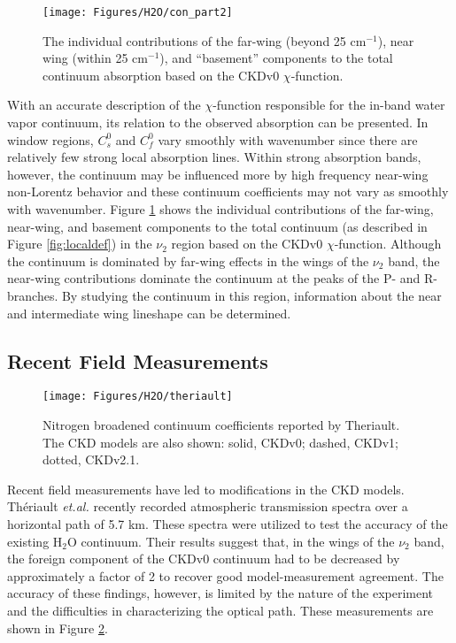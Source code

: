 \documentclass[11pt]{article}
\begin{document}
\begin{figure}
\begin{center}
  \texttt{[image: Figures/H2O/con\_part2]}\end{center}
  \caption[Far-wing, near-wing, and basement contributions to the total continuum.]
	{The individual contributions of the far-wing 
    (beyond 25 cm$^{-1}$), near wing (within 25 cm$^{-1}$), and 
    ``basement'' components to the total continuum
    absorption based on the CKDv0 $\chi$-function.}
  \label{fig:parts}
\end{figure}

With an accurate description of the $\chi$-function responsible for the
in-band water vapor continuum, its relation to the observed absorption can
be presented.  In window regions, $C_s^0$ and $C_f^0$ vary smoothly with 
wavenumber since there are relatively few strong local absorption lines.  
Within strong absorption 
bands, however, the continuum may be influenced more by high frequency 
near-wing non-Lorentz behavior and these continuum coefficients may not 
vary as smoothly with wavenumber.  Figure \ref{fig:parts} shows the 
individual contributions of the far-wing, near-wing, and basement components 
to the total continuum (as described in Figure \ref{fig:localdef}) in the 
$\nu_2$ region based on the CKDv0 $\chi$-function.  Although the 
continuum is dominated by far-wing effects in the wings of the $\nu_2$ band, 
the near-wing contributions dominate the continuum at the peaks of the P- and 
R-branches.  By studying the continuum in this region, information about the
near and intermediate wing lineshape can be determined.


\subsection{Recent Field Measurements}

\begin{figure}
\begin{center}\texttt{[image: Figures/H2O/theriault]}
\end{center}
  \caption[Nitrogen broadened continuum coefficients reported by
	Theriault.]{Nitrogen broadened continuum coefficients reported by
	Theriault. The CKD models are also shown: solid, CKDv0; dashed,
	CKDv1; dotted, CKDv2.1.}
  \label{fig:theriault1}
\end{figure}

Recent field measurements have led to modifications in the CKD models.
Th\'{e}riault {\it et.al.} \cite{the:94} recently recorded 
atmospheric transmission spectra over a horizontal path of 5.7 km.  These
spectra were utilized to test the accuracy of the existing H$_2$O
continuum.  Their results suggest that, in the wings of the $\nu_2$ band,
the foreign component of the CKDv0 continuum had to be decreased by
approximately a factor of 2 to recover good model-measurement agreement.
The accuracy of these findings, however, is limited by the nature of the
experiment and the difficulties in characterizing the optical path.
These measurements are shown in Figure \ref{fig:theriault1}.
\end{document}
